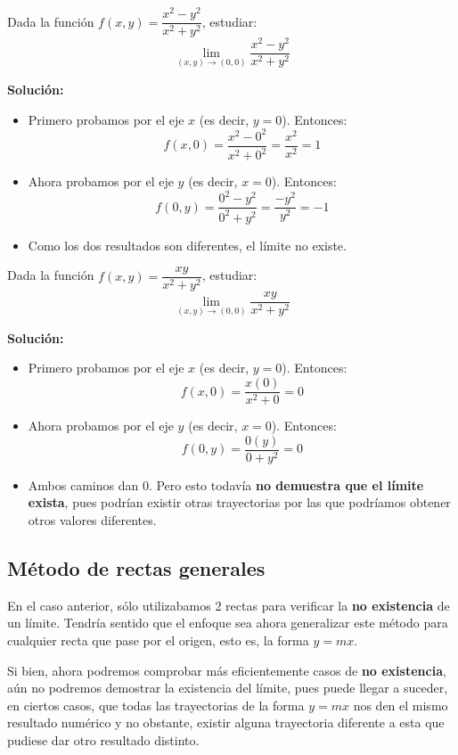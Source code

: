 \begin{ejemplo}
Dada la función $f(x,y)=\dfrac{x^2-y^2}{x^2+y^2}$, estudiar:
\[
\lim_{(x,y)\to(0,0)}\dfrac{x^2-y^2}{x^2+y^2}
\]
\end{ejemplo}
\textbf{Solución:}
\begin{itemize}
    \item Primero probamos por el eje $x$ (es decir, $y=0$). Entonces:
        \[
        f(x,0)=\frac{x^2-0^2}{x^2+0^2}=\dfrac{x^2}{x^2}=1
        \]

    \item Ahora probamos por el eje $y$ (es decir, $x=0$). Entonces:
        \[
        f(0,y)=\frac{0^2-y^2}{0^2+y^2}=\dfrac{-y^2}{y^2}=-1
        \]
    \item Como los dos resultados son diferentes, el límite no existe.
\end{itemize}
\newpage
\begin{ejemplo}
Dada la función $f(x,y)=\dfrac{xy}{x^2+y^2}$, estudiar:
\[
\lim_{(x,y)\to(0,0)}\dfrac{xy}{x^2+y^2}
\]
\end{ejemplo}
\textbf{Solución:}
\begin{itemize}
    \item Primero probamos por el eje $x$ (es decir, $y=0$). Entonces:
        \[
        f(x,0)=\frac{x(0)}{x^2+0}=0
        \]

    \item Ahora probamos por el eje $y$ (es decir, $x=0$). Entonces:
        \[
        f(0,y)=\frac{0(y)}{0+y^2}=0
        \]
    \item Ambos caminos dan 0. Pero esto todavía \textbf{no demuestra que el límite exista}, pues podrían existir otras trayectorias por las que podríamos obtener otros valores diferentes.
\end{itemize}

\subsection{Método de rectas generales}

En el caso anterior, sólo utilizabamos 2 rectas para verificar la \textbf{no existencia} de un límite. Tendría sentido que el enfoque sea ahora generalizar este método para cualquier recta que pase por el origen, esto es, la forma $y=mx$.

Si bien, ahora podremos comprobar más eficientemente casos de \textbf{no existencia}, aún no podremos demostrar la existencia del límite, pues puede llegar a suceder, en ciertos casos, que todas las trayectorias de la forma $y=mx$ nos den el mismo resultado numérico y no obstante, existir alguna trayectoria diferente a esta que pudiese dar otro resultado distinto.

